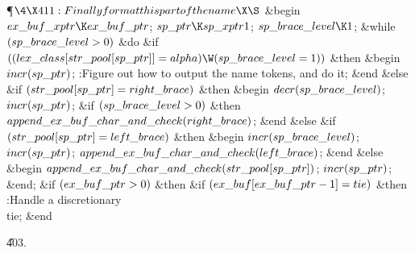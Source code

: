 \Y\P$\4\X411:Finally format this part of the name\X\S$\6
\&{begin} $\\{ex\_buf\_xptr}\K\\{ex\_buf\_ptr}$;\5
$\\{sp\_ptr}\K\\{sp\_xptr1}$;\5
$\\{sp\_brace\_level}\K1$;\6
\&{while} $(\\{sp\_brace\_level}>0)$ \1\&{do}\6
\&{if} $((\\{lex\_class}[\\{str\_pool}[\\{sp\_ptr}]]=\\{alpha})\W(\\{sp\_brace%
\_level}=1))$ \1\&{then}\6
\&{begin} $\\{incr}(\\{sp\_ptr})$;\5
:Figure out how to output the name tokens, and do it\X;\6
\&{end}\6
\4\&{else} \&{if} $(\\{str\_pool}[\\{sp\_ptr}]=\\{right\_brace})$ \1\&{then}\6
\&{begin} $\\{decr}(\\{sp\_brace\_level})$;\5
$\\{incr}(\\{sp\_ptr})$;\6
\&{if} $(\\{sp\_brace\_level}>0)$ \1\&{then}\5
$\\{append\_ex\_buf\_char\_and\_check}(\\{right\_brace})$;\2\6
\&{end}\6
\4\&{else} \&{if} $(\\{str\_pool}[\\{sp\_ptr}]=\\{left\_brace})$ \1\&{then}\6
\&{begin} $\\{incr}(\\{sp\_brace\_level})$;\5
$\\{incr}(\\{sp\_ptr})$;\5
$\\{append\_ex\_buf\_char\_and\_check}(\\{left\_brace})$;\6
\&{end}\6
\4\&{else} \&{begin} $\\{append\_ex\_buf\_char\_and\_check}(\\{str\_pool}[%
\\{sp\_ptr}])$;\5
$\\{incr}(\\{sp\_ptr})$;\6
\&{end};\2\2\2\2\6
\&{if} $(\\{ex\_buf\_ptr}>0)$ \1\&{then}\6
\&{if} $(\\{ex\_buf}[\\{ex\_buf\_ptr}-1]=\\{tie})$ \1\&{then}\5
:Handle a discretionary \\{tie}\X;\2\2\6
\&{end}\par
\U403.\fi

